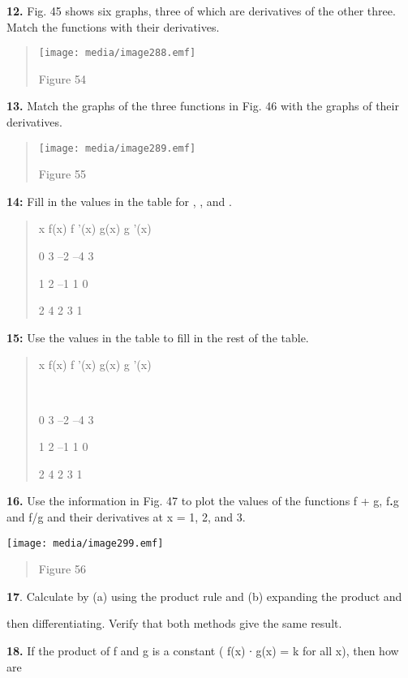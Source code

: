 \textbf{12.} Fig. 45 shows six graphs, three of which are derivatives of
the other three. Match the functions with their derivatives.

\begin{quote}
\texttt{[image: media/image288.emf]}

Figure 54
\end{quote}

\textbf{13.} Match the graphs of the three functions in Fig. 46 with the
graphs of their derivatives.

\begin{quote}
\texttt{[image: media/image289.emf]}

Figure 55
\end{quote}

\textbf{14:} Fill in the values in the table for , , and .

\begin{quote}
x f(x) f '(x) g(x) g '(x)

0 3 --2 --4 3

1 2 --1 1 0

2 4 2 3 1
\end{quote}

\textbf{15:} Use the values in the table to fill in the rest of the
table.

\begin{quote}
x f(x) f '(x) g(x) g '(x)

\emph{~~~~~ }

0 3 --2 --4 3

1 2 --1 1 0

2 4 2 3 1
\end{quote}

\textbf{16.} Use the information in Fig. 47 to plot the values of the
functions f + g, f\textbf{.}g and f/g and their derivatives at x = 1, 2,
and 3.

\texttt{[image: media/image299.emf]}

\begin{quote}
Figure 56
\end{quote}

\textbf{17}. Calculate by (a) using the product rule and (b) expanding
the product and

then differentiating. Verify that both methods give the same result.

\textbf{18.} If the product of f and g is a constant ( f(x) ∙ g(x) = k
for all x), then how are

